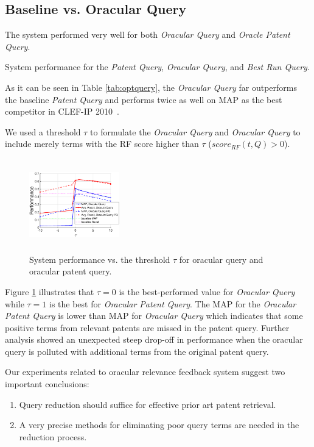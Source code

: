 \subsection{Baseline vs. Oracular Query}
The system performed very well for both {\em Oracular Query} and {\em Oracle Patent Query}.  
\begin{table}[htpb]
  \begin{center}
   \caption{System performance for the {\em Patent Query}, {\em Oracular Query}, and {\em Best Run Query}.}
   \vspace*{1ex}
     
  \label{tab:optquery}
  \end{center}  
\end{table}
As it can be seen in Table \ref{tab:optquery}, the {\em Oracular Query} far outperforms the baseline {\em Patent Query} and performs twice as well on MAP as the best competitor in CLEF-IP 2010~\cite{lopez2010experiments}.

We used a threshold $\tau$ to formulate the {\em Oracular Query} and {\em Oracular Query} to include merely terms with the RF score higher than $\tau$ ($score_{RF}(t,Q)>0$). 
\begin{figure}[htpb]
   \centering
   \includegraphics[width=0.35\textwidth,height=40mm]{figs/oracularquery2.eps}
   \caption{System performance vs. the threshold $\tau$ for oracular query and oracular patent query.}   
   \label{fig:oracular} 
\end{figure} 
Figure \ref{fig:oracular} illustrates that $\tau=0$ is the best-performed value for {\em Oracular Query} while $\tau=1$ is the best for {\em Oracular Patent Query}. The MAP for the {\em Oracular Patent Query} is lower than MAP for {\em Oracular Query} which indicates that some positive terms from relevant patents are missed in the patent query. Further analysis showed an unexpected steep drop-off in performance when the oracular query is polluted with additional terms from the original patent query. 

Our experiments related to oracular relevance feedback system suggest two important conclusions:
\begin{enumerate}
  \item Query reduction should suffice for effective prior art patent retrieval.
  \item A very precise methods for eliminating poor query terms are needed in the reduction process.
\end{enumerate}